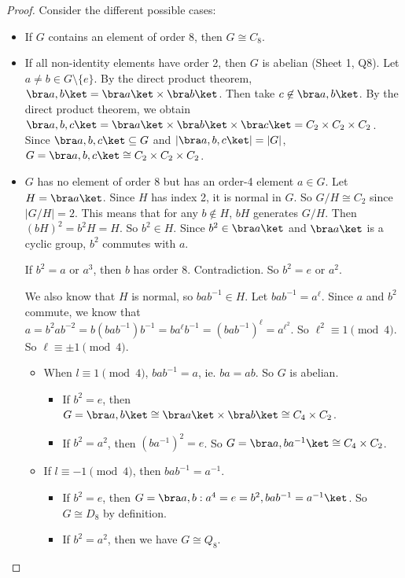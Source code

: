 \documentclass[a4paper]{article}
\begin{document}
  \begin{proof}
    Consider the different possible cases:
    \begin{itemize}
      \item If $G$ contains an element of order 8, then $G\cong C_8$.
      \item If all non-identity elements have order 2, then $G$ is abelian (Sheet 1, Q8). Let $a\not= b\in G\setminus\{e\}$. By the direct product theorem, $\bra a, b\ket = \bra a\ket\times\bra b\ket$. Then take $c\not\in \bra a, b\ket$. By the direct product theorem, we obtain $\bra a, b, c\ket = \bra a\ket\times\bra b\ket\times\bra c\ket = C_2\times C_2\times C_2$. Since $\bra a, b, c\ket\subseteq G$ and $|\bra a, b, c\ket| = |G|$, $G = \bra a, b, c\ket \cong C_2\times C_2\times C_2$.
      \item $G$ has no element of order 8 but has an order-4 element $a\in G$. Let $H = \bra a\ket$. Since $H$ has index 2, it is normal in $G$. So $G/H \cong C_2$ since $|G/H| = 2$. This means that for any $b\not\in H$, $bH$ generates $G/H$. Then $(bH)^2 = b^2H = H$. So $b^2\in H$. Since $b^2\in \bra a\ket$ and $\bra a\ket$ is a cyclic group, $b^2$ commutes with $a$.

        If $b^2 = a$ or $a^3$, then $b$ has order 8. Contradiction. So $b^2 = e$ or $a^2$.

        We also know that $H$ is normal, so $bab^{-1}\in H$. Let $bab^{-1} = a^\ell$. Since $a$ and $b^2$ commute, we know that $a = b^2 ab^{-2}  = b(bab^{-1})b^{-1} = ba^\ell b^{-1} = (bab^{-1})^{\ell} = a^{\ell^2}$. So $\ell^2 \equiv 1\pmod 4$. So $\ell \equiv \pm 1 \pmod 4$.

        \begin{itemize}
          \item When $l\equiv 1\pmod 4$, $bab^{-1} = a$, ie. $ba = ab$. So $G$ is abelian.
            \begin{itemize}
              \item  If $b^2 = e$, then $G = \bra a, b\ket \cong \bra a\ket \times \bra b\ket \cong C_4\times C_2$.
              \item If $b^2 = a^2$, then $(ba^{-1})^2 = e$. So $G = \bra a, ba^{-1}\ket \cong C_4\times C_2$.
            \end{itemize}
          \item If $l \equiv -1\pmod 4$, then $bab^{-1} = a^{-1}$. 
            \begin{itemize}
              \item If $b^2 = e$, then $G = \bra a, b: a^4 = e = b^2, bab^{-1} = a^{-1}\ket$. So $G\cong D_8$ by definition.
              \item If $b^2 = a^2$, then we have $G\cong Q_8$. 
            \end{itemize}
        \end{itemize}
    \end{itemize}
  \end{proof}
\end{document}
